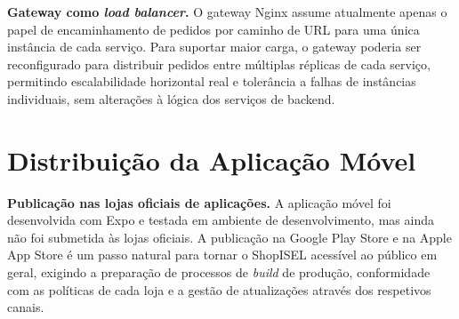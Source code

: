 \textbf{Gateway como \textit{load balancer}.} O gateway Nginx assume atualmente apenas o papel de encaminhamento de pedidos por caminho de \ac{URL} para uma única instância de cada serviço. Para suportar maior carga, o gateway poderia ser reconfigurado para distribuir pedidos entre múltiplas réplicas de cada serviço, permitindo escalabilidade horizontal real e tolerância a falhas de instâncias individuais, sem alterações à lógica dos serviços de backend.

\section{Distribuição da Aplicação Móvel}
\label{sec:7.4}

\textbf{Publicação nas lojas oficiais de aplicações.} A aplicação móvel foi desenvolvida com Expo e testada em ambiente de desenvolvimento, mas ainda não foi submetida às lojas oficiais. A publicação na Google Play Store e na Apple App Store é um passo natural para tornar o ShopISEL acessível ao público em geral, exigindo a preparação de processos de \textit{build} de produção, conformidade com as políticas de cada loja e a gestão de atualizações através dos respetivos canais.

